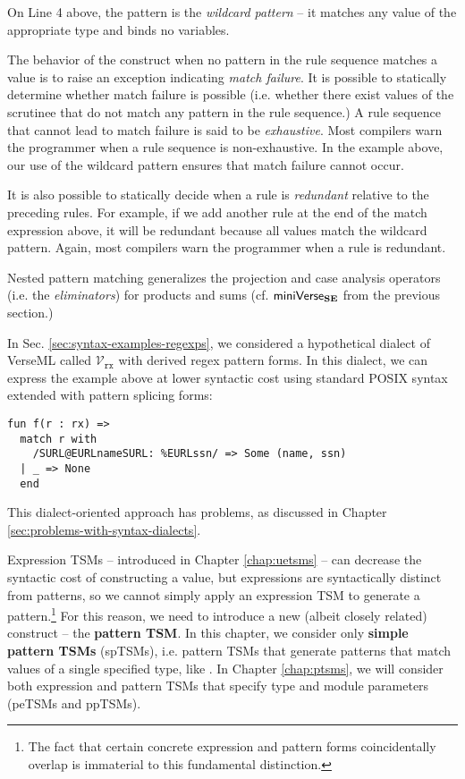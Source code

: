 On Line 4 above, the pattern \li{_} is the \emph{wildcard pattern} -- it matches any value of the appropriate type and binds no variables.

The behavior of the  construct when no pattern in the rule sequence matches a value is to raise an exception indicating \emph{match failure}. It is possible to statically determine whether match failure is possible (i.e. whether there exist values of the scrutinee that do not match any pattern in the rule sequence.) A rule sequence that cannot lead to match failure is said to be \emph{exhaustive}. Most compilers warn the programmer when a rule sequence is non-exhaustive. In the example above, our use of the wildcard pattern ensures that match failure cannot occur. 

It is also possible to statically decide when a rule is \emph{redundant} relative to the preceding rules. For example, if we add  another rule at the end of the match expression above, it will be redundant because all values match the wildcard pattern. Again, most compilers warn the programmer when a rule is redundant.

Nested pattern matching generalizes the projection and case analysis operators (i.e. the \emph{eliminators}) for products and sums (cf. $\mathsf{miniVerse}_\textbf{SE}$ from the previous section.) 

In Sec. \ref{sec:syntax-examples-regexps}, we considered a hypothetical dialect of VerseML called $\mathcal{V}_\texttt{rx}$ with derived regex pattern forms. In this dialect, we can express the example above at lower syntactic cost using standard POSIX syntax extended with pattern splicing forms:

\begin{lstlisting}
fun f(r : rx) => 
  match r with 
    /SURL@EURLnameSURL: %EURLssn/ => Some (name, ssn)
  | _ => None
  end
\end{lstlisting}
\noindent
This dialect-oriented approach has problems, as  discussed in Chapter \ref{sec:problems-with-syntax-dialects}.


Expression TSMs -- introduced in Chapter \ref{chap:uetsms} -- can decrease the syntactic cost of constructing a value, but expressions are syntactically distinct from patterns, so we cannot simply apply an expression TSM to generate a pattern.\footnote{The fact that certain concrete expression and pattern forms coincidentally overlap is immaterial to this fundamental distinction.} %
For this reason, we need to introduce a new (albeit closely related) construct -- the \textbf{pattern TSM}. In this chapter, we consider only \textbf{simple pattern TSMs} (spTSMs), i.e. pattern TSMs that generate patterns that match values of a single specified type, like . In Chapter \ref{chap:ptsms}, we will consider both expression and pattern TSMs that specify type and module parameters (peTSMs and ppTSMs). 

